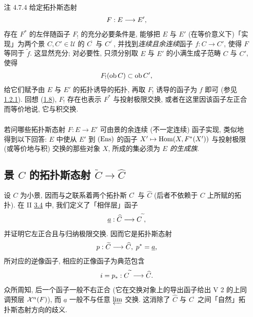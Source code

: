 \begin{enonce*}[remark]{注 4.7.4}
给定拓扑斯态射
$$
F:E\longrightarrow E'{},
$$
存在 $F^{\ast}$ 的左伴随函子 $F_{!}$ 的充分必要条件是, 能够把 $E$ 与 $E'$ (在等价意义下)「实现」为两个景 $C,C'\in 𝒰$ 的 $C^{\widetilde{\phantom{,}}}$ 与 ${C'}^{\widetilde{\phantom{,}}}$, 并找到\emph{连续且余连续}函子 $f:C\rightarrow C'$, 使得 $F$ 等同于 $\widetilde{f}$. 这显然充分; 对必要性, 只须分别取 $E$ 与 $E'$ 的小满生成子范畴 $C$ 与 $C'$, 使得
$$
F_{!}(\operatorname{ob} C)\subset \operatorname{ob} C'{},
$$
给它们赋予由 $E$ 与 $E'$ 的拓扑诱导的拓扑, 再取 $F_{!}$ 诱导的函子为 $f$ 即可 (参见 \hyperref[IV.cor1.2.1]{1.2.1}). 回想 (\hyperref[IV.rem1.8]{1.8}), $F_{!}$ 存在也表示 $F^{\ast}$ 与投射极限交换, 或者\pageoriginale 在这里因该函子左正合而等价地说, 它与积交换.
\end{enonce*}

\setcounter{subsubsection}{4}
\subsubsection{}
若问哪些拓扑斯态射 $F:E\rightarrow E'$ 可由景的余连续 (不一定连续) 函子实现, 类似地得到以下回答: $E$ 中使从 $E'$ 到 $(\operatorname{Ens})$ 的函子 $X'\mapsto \operatorname{Hom}(X,F^{\ast}(X'))$ 与投射极限 (或等价地与积) 交换的那些对象 $X$, 所成的集必须为 \emph{$E$ 的生成族}.

\subsection{景 $C$ 的拓扑斯态射 $\widetilde{C}\rightarrow\widehat{C}$}

设 $C$ 为小景, 因而与之联系着两个拓扑斯 $C^{\widetilde{\phantom{,}}}$ 与 $\widehat{C}$ (后者不依赖于 $C$ 上所赋的拓扑). 在 II \hyperref[II.theo3.4]{3.4} 中, 我们定义了「相伴层」函子
$$
\underline{a}:\widehat{C}\longrightarrow
C^{\widetilde{\phantom{,}}}{},
$$
并证明它左正合且与归纳极限交换. 因而它是拓扑斯态射
$$
p:\widetilde{C}\longrightarrow \widehat{C},\;
p^{\ast}=\underline{a}{},
$$
所对应的逆像函子, 相应的正像函子为典范包含
$$
i=p_{\ast}:C^{\widetilde{\phantom{,}}}\longrightarrow
\widehat{C}{}.
$$
众所周知, 后一个函子一般不右正合 (它在交换对象上的导出函子给出 V 2 的上同调预层 ${\mathcal X}^n(F)$), 而 $\underline{a}$ 一般不与任意 $\varprojlim$ 交换. 这消除了 $\widehat{C}$ 与 $C^{\widetilde{\phantom{,}}}$ 之间「自然」拓扑斯态射方向的歧义.

